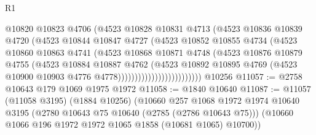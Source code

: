 \begin{lexlean}{R1}
\begin{coremodule}
                                  @10820
                                  @10823
                                  @4706
                                  (@4523
                                    @10828
                                    @10831
                                    @4713
                                    (@4523
                                      @10836
                                      @10839
                                      @4720
                                      (@4523
                                        @10844
                                        @10847
                                        @4727
                                        (@4523
                                          @10852
                                          @10855
                                          @4734
                                          (@4523
                                            @10860
                                            @10863
                                            @4741
                                            (@4523
                                              @10868
                                              @10871
                                              @4748
                                              (@4523
                                                @10876
                                                @10879
                                                @4755
                                                (@4523
                                                  @10884
                                                  @10887
                                                  @4762
                                                  (@4523
                                                    @10892
                                                    @10895
                                                    @4769
                                                    (@4523
                                                      @10900
                                                      @10903
                                                      @4776
                                                      @4778)))))))))))))))))))))))))
    @10256
@11057 := @2758 @10643 @179 @1069 @1975 @1972
@11058 := @1840 @10640
@11087 := @11057
    (@11058 @3195)
    (@1884 @10256)
    (@10660
      @257
      @1068
      @1972
      @1974
      @10640
      @3195
      (@2780 @10643 @75 @10640 (@2785 (@2786 @10643 @75)))
      (@10660 @1066 @196 @1972 @1972 @1065 @1858 (@10681 @1065) @10700))

\end{coremodule}
\end{lexlean}
